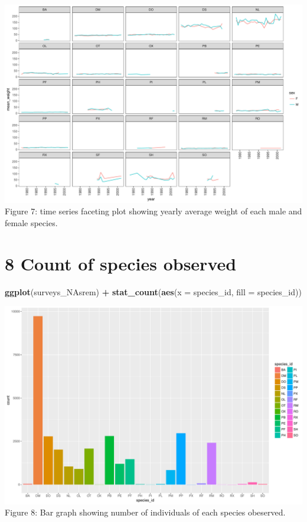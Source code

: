 \documentclass[]{article}
\newenvironment{Shaded}{\begin{snugshade}}{\end{snugshade}}
\newcommand{\KeywordTok}[1]{\textcolor[rgb]{0.13,0.29,0.53}{\textbf{#1}}}
\newcommand{\DataTypeTok}[1]{\textcolor[rgb]{0.13,0.29,0.53}{#1}}
\newcommand{\StringTok}[1]{\textcolor[rgb]{0.31,0.60,0.02}{#1}}
\newcommand{\OperatorTok}[1]{\textcolor[rgb]{0.81,0.36,0.00}{\textbf{#1}}}
\newcommand{\NormalTok}[1]{#1}
\begin{document}
\includegraphics{figs/Sex_average_weight-1.pdf} Figure 7: time series
faceting plot showing yearly average weight of each male and female
species.

\section{8 Count of species observed}\label{count-of-species-observed}

\begin{Shaded}
\begin{Highlighting}[]
\KeywordTok{ggplot}\NormalTok{(surveys_NAsrem) }\OperatorTok{+}\StringTok{ }\KeywordTok{stat_count}\NormalTok{(}\KeywordTok{aes}\NormalTok{(}\DataTypeTok{x =}\NormalTok{ species_id, }\DataTypeTok{fill =}\NormalTok{ species_id))}
\end{Highlighting}
\end{Shaded}

\includegraphics{figs/bar_chart_individuals_each_species-1.pdf} Figure
8: Bar graph showing number of individuals of each species obeserved.
\end{document}
